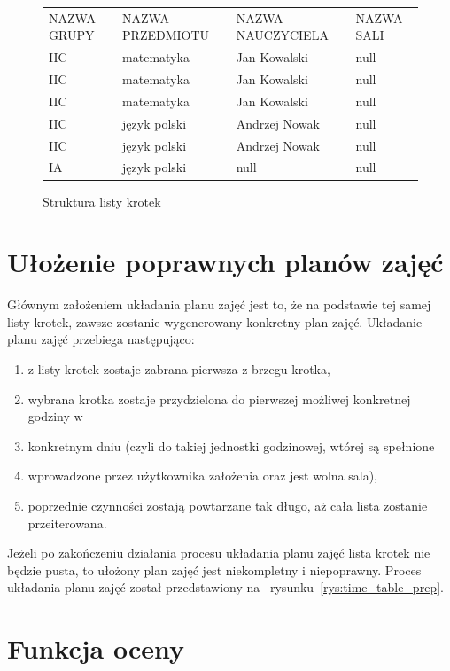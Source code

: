 \begin{figure}[h]
\begin{tabular}{llll}
NAZWA GRUPY & NAZWA PRZEDMIOTU & NAZWA NAUCZYCIELA & NAZWA SALI \\
IIC         & matematyka       & Jan Kowalski      & null       \\
IIC         & matematyka       & Jan Kowalski      & null       \\
IIC         & matematyka       & Jan Kowalski      & null       \\
IIC         & język polski     & Andrzej Nowak     & null       \\
IIC         & język polski     & Andrzej Nowak     & null       \\
IA          & język polski     & null              & null      
\end{tabular}
\caption{Struktura listy krotek} \label{rys:krotki}
\end{figure}

\section{Ułożenie poprawnych planów zajęć}

    Głównym założeniem układania planu zajęć jest to, że na podstawie tej samej listy krotek, zawsze zostanie wygenerowany konkretny plan zajęć. 
Układanie planu zajęć przebiega następująco:
\begin{enumerate}
	\item z listy krotek zostaje zabrana pierwsza z brzegu krotka,
	\item wybrana krotka zostaje przydzielona do pierwszej możliwej konkretnej godziny w 		\item konkretnym dniu (czyli do takiej jednostki godzinowej, wtórej są spełnione 			\item wprowadzone przez użytkownika założenia oraz jest wolna sala),
	\item poprzednie czynności zostają powtarzane tak długo, aż cała lista zostanie przeiterowana.
\end{enumerate}
Jeżeli po zakończeniu działania procesu układania planu zajęć lista krotek nie będzie pusta, to ułożony plan zajęć jest niekompletny i niepoprawny. Proces układania planu zajęć został przedstawiony na ~rysunku~\ref{rys:time_table_prep}.

\section{Funkcja oceny}

